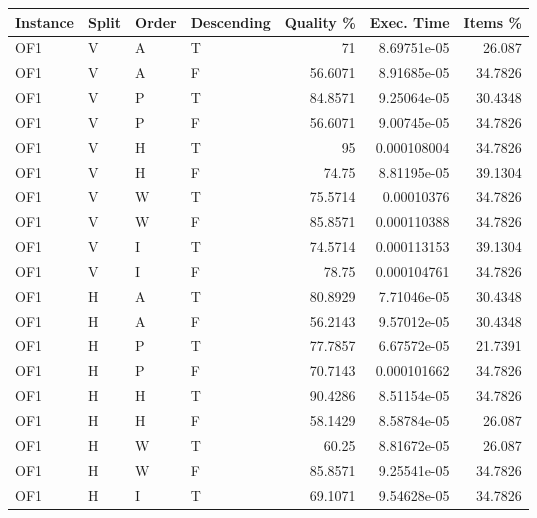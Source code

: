 \begin{longtable}{llllrrr}
    \hline
    Instance & Split & Order & Descending & Quality \% & Exec. Time  & Items \% \\
    \hline
    \endhead
    OF1      & V     & A     & T          & 71         & 8.69751e-05 & 26.087   \\
    OF1      & V     & A     & F          & 56.6071    & 8.91685e-05 & 34.7826  \\
    OF1      & V     & P     & T          & 84.8571    & 9.25064e-05 & 30.4348  \\
    OF1      & V     & P     & F          & 56.6071    & 9.00745e-05 & 34.7826  \\
    OF1      & V     & H     & T          & 95         & 0.000108004 & 34.7826  \\
    OF1      & V     & H     & F          & 74.75      & 8.81195e-05 & 39.1304  \\
    OF1      & V     & W     & T          & 75.5714    & 0.00010376  & 34.7826  \\
    OF1      & V     & W     & F          & 85.8571    & 0.000110388 & 34.7826  \\
    OF1      & V         & I         & T          & 74.5714    & 0.000113153 & 39.1304  \\
    OF1      & V         & I         & F          & 78.75      & 0.000104761 & 34.7826  \\
    OF1      & H         & A         & T          & 80.8929    & 7.71046e-05 & 30.4348  \\
    OF1      & H         & A         & F          & 56.2143    & 9.57012e-05 & 30.4348  \\
    OF1      & H         & P         & T          & 77.7857    & 6.67572e-05 & 21.7391  \\
    OF1      & H         & P         & F          & 70.7143    & 0.000101662 & 34.7826  \\
    OF1      & H         & H         & T          & 90.4286    & 8.51154e-05 & 34.7826  \\
    OF1      & H         & H         & F          & 58.1429    & 8.58784e-05 & 26.087   \\
    OF1      & H         & W         & T          & 60.25      & 8.81672e-05 & 26.087   \\
    OF1      & H         & W         & F          & 85.8571    & 9.25541e-05 & 34.7826  \\
    OF1      & H         & I         & T          & 69.1071    & 9.54628e-05 & 34.7826  \\

\end{longtable}
